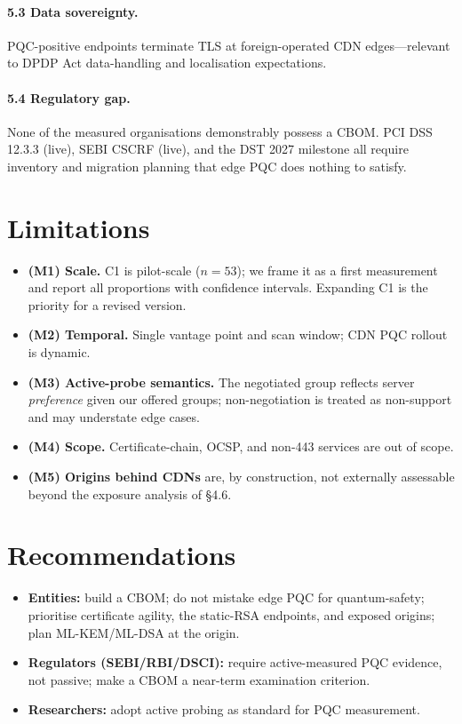 \documentclass[11pt]{article}
\begin{document}
\paragraph{5.3 Data sovereignty.} PQC-positive endpoints terminate TLS at foreign-operated CDN
edges---relevant to DPDP Act data-handling and localisation expectations.

\paragraph{5.4 Regulatory gap.} None of the measured organisations demonstrably possess a CBOM.
PCI DSS 12.3.3 (live), SEBI CSCRF (live), and the DST 2027 milestone all require inventory and
migration planning that edge PQC does nothing to satisfy.

\section{Limitations}
\begin{itemize}[leftmargin=1.4em,nosep]
  \item \textbf{(M1) Scale.} C1 is pilot-scale ($n = 53$); we frame it as a first measurement and
  report all proportions with confidence intervals. Expanding C1 is the priority for a revised
  version.
  \item \textbf{(M2) Temporal.} Single vantage point and scan window; CDN PQC rollout is dynamic.
  \item \textbf{(M3) Active-probe semantics.} The negotiated group reflects server \emph{preference}
  given our offered groups; non-negotiation is treated as non-support and may understate edge cases.
  \item \textbf{(M4) Scope.} Certificate-chain, OCSP, and non-443 services are out of scope.
  \item \textbf{(M5) Origins behind CDNs} are, by construction, not externally assessable beyond the
  exposure analysis of \S4.6.
\end{itemize}

\section{Recommendations}
\begin{itemize}[leftmargin=1.4em,nosep]
  \item \textbf{Entities:} build a CBOM; do not mistake edge PQC for quantum-safety; prioritise
  certificate agility, the static-RSA endpoints, and exposed origins; plan ML-KEM/ML-DSA at the
  origin.
  \item \textbf{Regulators (SEBI/RBI/DSCI):} require active-measured PQC evidence, not passive; make
  a CBOM a near-term examination criterion.
  \item \textbf{Researchers:} adopt active probing as standard for PQC measurement.
\end{itemize}
\end{document}
